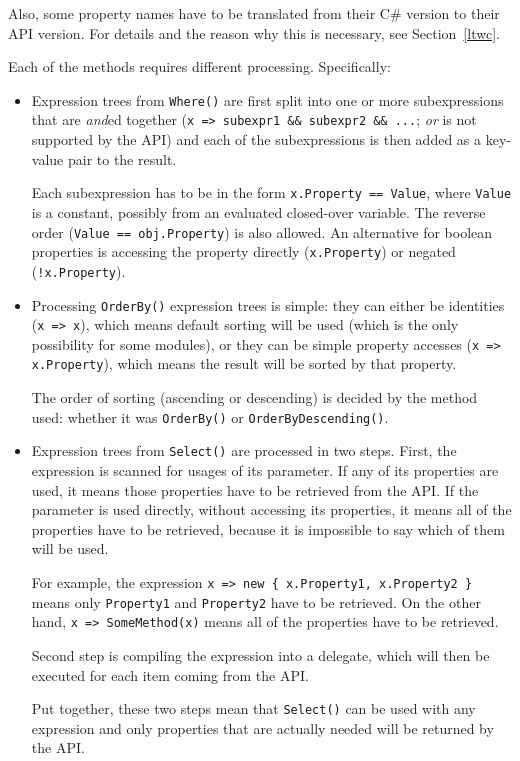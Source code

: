 Also, some property names have to be translated from their C\# version to their API version.
For details and the reason why this is necessary, see Section~\ref{ltwc}.

\medskip

Each of the methods requires different processing. Specifically:

\begin{itemize}
\item Expression trees from \lstinline{Where()} are first split into one or more subexpressions
that are \emph{and}ed together (\lstinline{x => subexpr1 && subexpr2 && ...}; \emph{or} is not supported by the API)
and each of the subexpressions is then added as a key-value pair to the result.

Each subexpression has to be in the form \lstinline{x.Property == Value},
where \lstinline{Value} is a constant, possibly from an evaluated closed-over variable.
The reverse order (\lstinline{Value == obj.Property}) is also allowed.
An alternative for boolean properties is accessing the property directly (\lstinline{x.Property})
or negated (\lstinline{!x.Property}).

\item Processing \lstinline{OrderBy()} expression trees is simple:
they can either be identities (\lstinline{x => x}), which means default sorting will be used
(which is the only possibility for some modules),
or they can be simple property accesses (\lstinline{x => x.Property}),
which means the result will be sorted by that property.

The order of sorting (ascending or descending) is decided by the method used:
whether it was \lstinline{OrderBy()} or \lstinline{OrderByDescending()}.

\item Expression trees from \lstinline{Select()} are processed in two steps.
First, the expression is scanned for usages of its parameter.
If any of its properties are used, it means those properties have to be retrieved from the API.
If the parameter is used directly, without accessing its properties,
it means all of the properties have to be retrieved, because it is impossible to say which of them will be used.

For example, the expression \lstinline|x => new { x.Property1, x.Property2 }|
means only \lstinline{Property1} and \lstinline{Property2} have to be retrieved.
On the other hand, \lstinline{x => SomeMethod(x)} means all of the properties have to be retrieved.

Second step is compiling the expression into a delegate,
which will then be executed for each item coming from the API.

Put together, these two steps mean that \lstinline{Select()} can be used with any expression
and only properties that are actually needed will be returned by the API.
\end{itemize}

